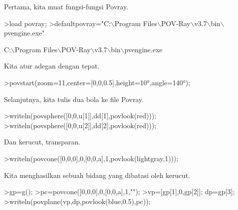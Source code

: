 \documentclass[12pt,arial,letterpaper]{book}
\begin{document}
\begin{eulercomment}
\begin{eulercomment}
\begin{eulercomment}
\begin{eulercomment}
\begin{eulercomment}
\begin{eulercomment}
\begin{eulercomment}
\begin{eulercomment}
\begin{eulercomment}
\begin{eulercomment}
\begin{eulercomment}
\begin{eulercomment}
\begin{eulercomment}
\begin{eulercomment}
\begin{eulercomment}
\begin{eulercomment}
\begin{eulercomment}
\begin{eulercomment}
\begin{eulercomment}
\begin{eulercomment}
\begin{eulercomment}
\begin{eulercomment}
\begin{eulercomment}
\begin{eulercomment}
\begin{eulercomment}
\begin{eulercomment}
\begin{eulercomment}
\begin{eulercomment}
\begin{eulercomment}
\begin{eulercomment}
\begin{eulercomment}
Pertama, kita muat fungsi-fungsi Povray.
\end{eulercomment}
\begin{eulerprompt}
>load povray;
>defaultpovray="C:\(\backslash\)Program Files\(\backslash\)POV-Ray\(\backslash\)v3.7\(\backslash\)bin\(\backslash\)pvengine.exe"
\end{eulerprompt}
\begin{euleroutput}
  C:\(\backslash\)Program Files\(\backslash\)POV-Ray\(\backslash\)v3.7\(\backslash\)bin\(\backslash\)pvengine.exe
\end{euleroutput}
\begin{eulercomment}
Kita atur adegan dengan tepat.
\end{eulercomment}
\begin{eulerprompt}
>povstart(zoom=11,center=[0,0,0.5],height=10°,angle=140°);
\end{eulerprompt}
\begin{eulercomment}
Selanjutnya, kita tulis dua bola ke file Povray.
\end{eulercomment}
\begin{eulerprompt}
>writeln(povsphere([0,0,u[1]],dd[1],povlook(red)));
>writeln(povsphere([0,0,u[2]],dd[2],povlook(red)));
\end{eulerprompt}
\begin{eulercomment}
Dan kerucut, transparan.
\end{eulercomment}
\begin{eulerprompt}
>writeln(povcone([0,0,0],0,[0,0,a],1,povlook(lightgray,1)));
\end{eulerprompt}
\begin{eulercomment}
Kita menghasilkan sebuah bidang yang dibatasi oleh kerucut.
\end{eulercomment}
\begin{eulerprompt}
>gp=g();
>pc=povcone([0,0,0],0,[0,0,a],1,"");
>vp=[gp[1],0,gp[2]]; dp=gp[3];
>writeln(povplane(vp,dp,povlook(blue,0.5),pc));
\end{eulerprompt}
\begin{eulercomment}

\end{eulercomment}
\end{eulercomment}
\end{eulercomment}
\end{eulercomment}
\end{eulercomment}
\end{eulercomment}
\end{eulercomment}
\end{eulercomment}
\end{eulercomment}
\end{eulercomment}
\end{eulercomment}
\end{eulercomment}
\end{eulercomment}
\end{eulercomment}
\end{eulercomment}
\end{eulercomment}
\end{eulercomment}
\end{eulercomment}
\end{eulercomment}
\end{eulercomment}
\end{eulercomment}
\end{eulercomment}
\end{eulercomment}
\end{eulercomment}
\end{eulercomment}
\end{eulercomment}
\end{eulercomment}
\end{eulercomment}
\end{eulercomment}
\end{eulercomment}
\end{eulercomment}
\end{document}
